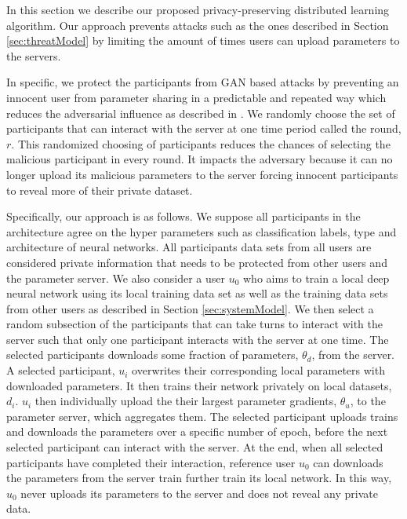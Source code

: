 \documentclass[letterpaper]{article}
\begin{document}
\begin{flushleft}
{In this section we describe our proposed privacy-preserving distributed learning algorithm. Our approach prevents attacks such as the ones described in Section \ref{sec:threatModel} by limiting the amount of times users can upload parameters to the servers. 

In specific, we protect the participants from GAN based attacks by preventing an innocent user from parameter sharing in a predictable and repeated way which reduces the adversarial influence as described in \cite{hitaj2017deep}.  We randomly choose the set of participants that can interact with the server at one time period called the round, $r$. This randomized choosing of participants reduces the chances of selecting the malicious participant in every round. It impacts the adversary because it can no longer upload its malicious parameters to the server forcing innocent participants to reveal more of their private dataset.

Specifically, our approach is as follows. We suppose all participants in the architecture agree on the hyper parameters such as classification labels, type and architecture of neural networks.
All participants data sets from all users are considered private information that needs to be protected from other users and the parameter server. We also consider a user $u_0$ who aims to train a local deep neural network using its local training data set as well as the training data sets from other users as described in Section \ref{sec:systemModel}. 
We then select a random subsection of the participants that can take turns to interact with the server such that only one participant interacts with the server at one time. The selected participants downloads some fraction of parameters, $\theta_d$, from the server. A selected participant, $u_i$  overwrites their corresponding local parameters with downloaded parameters. It then trains their network privately on local datasets, $d_i$. $u_i$ then individually upload the their largest parameter gradients, $\theta_u$,  to the parameter server, which aggregates them.
The selected participant uploads trains and downloads the parameters over a specific number of epoch, before the next selected participant can interact with the server.
At the end, when all selected participants have completed their interaction, reference user $u_0$ can downloads the parameters from the server train further train its local network. In this way, $u_0$ never uploads its parameters to the server and does not reveal any private data. 


}
\end{flushleft}
\end{document}
